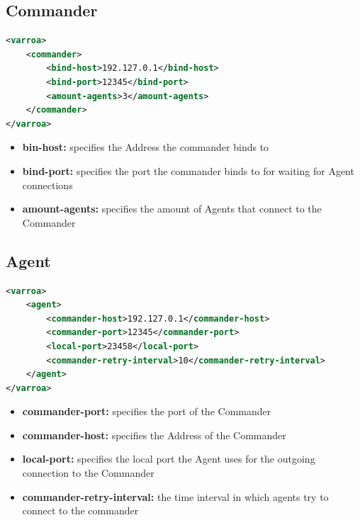 \subsection{Commander}\label{sec:commanderConfig}
\begin{lstlisting}[caption={Commander XML configuration}, captionpos=b, label={lst:commanderConfig}, language=XML]
<varroa>
    <commander>
		<bind-host>192.127.0.1</bind-host>
        <bind-port>12345</bind-port>
        <amount-agents>3</amount-agents>
    </commander>
</varroa>
\end{lstlisting}
\begin{itemize}
	\item \textbf{bin-host:} specifies the Address the commander binds to
	\item \textbf{bind-port:} specifies the port the commander binds to for waiting for Agent connections
	\item \textbf{amount-agents:} specifies the amount of Agents that connect to the Commander
\end{itemize}

\subsection{Agent}\label{sec:agentConfig}
\begin{lstlisting}[caption={Agent XML configuration}, captionpos=b, label={lst:agentConfig}, language=XML]
<varroa>
    <agent>
		<commander-host>192.127.0.1</commander-host>
        <commander-port>12345</commander-port>
        <local-port>23458</local-port>
		<commander-retry-interval>10</commander-retry-interval>
    </agent>
</varroa>
\end{lstlisting}
\begin{itemize}
	\item \textbf{commander-port:} specifies the port of the Commander
	\item \textbf{commander-host:} specifies the Address of the Commander
	\item \textbf{local-port:} specifies the local port the Agent uses for the outgoing connection to the Commander %
	\item \textbf{commander-retry-interval:} the time interval in which agents try to connect to the commander
\end{itemize}